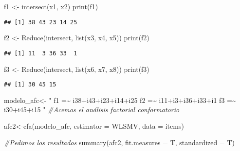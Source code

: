 \documentclass[
]{article}
\newenvironment{Shaded}{\begin{snugshade}}{\end{snugshade}}
\newcommand{\AttributeTok}[1]{\textcolor[rgb]{0.77,0.63,0.00}{#1}}
\newcommand{\CommentTok}[1]{\textcolor[rgb]{0.56,0.35,0.01}{\textit{#1}}}
\newcommand{\FunctionTok}[1]{\textcolor[rgb]{0.00,0.00,0.00}{#1}}
\newcommand{\NormalTok}[1]{#1}
\newcommand{\OtherTok}[1]{\textcolor[rgb]{0.56,0.35,0.01}{#1}}
\newcommand{\StringTok}[1]{\textcolor[rgb]{0.31,0.60,0.02}{#1}}
\begin{document}
\begin{Shaded}
\begin{Highlighting}[]
\NormalTok{f1 }\OtherTok{\textless{}{-}} \FunctionTok{intersect}\NormalTok{(x1, x2) }
\FunctionTok{print}\NormalTok{(f1)}
\end{Highlighting}
\end{Shaded}

\begin{verbatim}
## [1] 38 43 23 14 25
\end{verbatim}

\begin{Shaded}
\begin{Highlighting}[]
\NormalTok{f2 }\OtherTok{\textless{}{-}} \FunctionTok{Reduce}\NormalTok{(intersect, }\FunctionTok{list}\NormalTok{(x3, x4, x5)) }
\FunctionTok{print}\NormalTok{(f2)}
\end{Highlighting}
\end{Shaded}

\begin{verbatim}
## [1] 11  3 36 33  1
\end{verbatim}

\begin{Shaded}
\begin{Highlighting}[]
\NormalTok{f3 }\OtherTok{\textless{}{-}} \FunctionTok{Reduce}\NormalTok{(intersect, }\FunctionTok{list}\NormalTok{(x6, x7, x8)) }
\FunctionTok{print}\NormalTok{(f3)}
\end{Highlighting}
\end{Shaded}

\begin{verbatim}
## [1] 30 45 15
\end{verbatim}

\begin{Shaded}
\begin{Highlighting}[]
\NormalTok{modelo\_afc}\OtherTok{\textless{}{-}} \StringTok{"}
\StringTok{f1  =\textasciitilde{} i38+i43+i23+i14+i25}
\StringTok{f2  =\textasciitilde{} i11+i3+i36+i33+i1}
\StringTok{f3  =\textasciitilde{} i30+i45+i15}
\StringTok{"}
\CommentTok{\#Acemos el análisis factorial conformatorio}

\NormalTok{afc2}\OtherTok{\textless{}{-}}\FunctionTok{cfa}\NormalTok{(modelo\_afc, }\AttributeTok{estimator =} \StringTok{\textquotesingle{}WLSMV\textquotesingle{}}\NormalTok{, }\AttributeTok{data =}\NormalTok{ items)}

\CommentTok{\#Pedimos los resultados}
\FunctionTok{summary}\NormalTok{(afc2, }\AttributeTok{fit.measures =}\NormalTok{ T, }\AttributeTok{standardized =}\NormalTok{ T)}
\end{Highlighting}
\end{Shaded}
\end{document}
